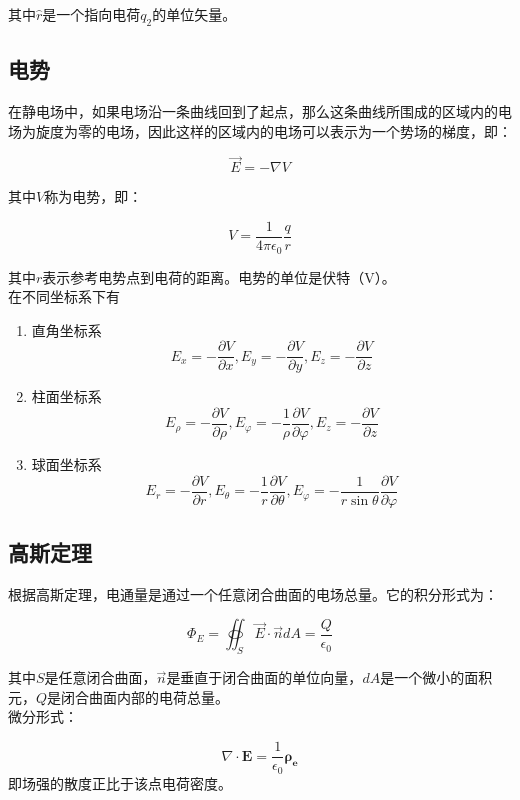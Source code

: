 其中$\hat{r}$是一个指向电荷$q_2$的单位矢量。

\subsection{电势}

在静电场中，如果电场沿一条曲线回到了起点，那么这条曲线所围成的区域内的电场为旋度为零的电场，因此这样的区域内的电场可以表示为一个势场的梯度，即：

$$ \vec{E} = -\nabla V $$

其中$V$称为电势，即：

$$ V = \frac{1}{4\pi\epsilon_0}\frac{q}{r} $$

其中$r$表示参考电势点到电荷的距离。电势的单位是伏特（V）。\\
在不同坐标系下有
\begin{enumerate}
	\item 直角坐标系 
	\begin{equation}\label{key}
		E_x=-\dfrac{\partial V}{\partial x},	E_y=-\dfrac{\partial V}{\partial y},	E_z=-\dfrac{\partial V}{\partial z}
	\end{equation}
\item 柱面坐标系
\begin{equation}\label{key}
	E_\rho=-\dfrac{\partial V}{\partial \rho},
	E_\varphi=-\dfrac{1}{\rho}\dfrac{\partial V}{\partial \varphi},
	E_z=-\dfrac{\partial V}{\partial z}
\end{equation}
\item 球面坐标系
\begin{equation}\label{key}
	E_r=-\dfrac{\partial V}{\partial r},
	E_\theta=-\dfrac{1}{r}\dfrac{\partial V}{\partial \theta},
	E_\varphi=-\dfrac{1}{r\sin \theta}\dfrac{\partial V}{\partial \varphi}
\end{equation}
\end{enumerate}
\subsection{高斯定理}

根据高斯定理，电通量是通过一个任意闭合曲面的电场总量。它的积分形式为：

$$ \Phi_E = \oiint_S \vec{E}\cdot\vec{n}dA = \frac{Q}{\epsilon_0} $$

其中$S$是任意闭合曲面，$\vec{n}$是垂直于闭合曲面的单位向量，$dA$是一个微小的面积元，$Q$是闭合曲面内部的电荷总量。\\
微分形式：

\begin{equation}\label{key}
	\nabla\cdot \bm{E}=\dfrac{1}{\epsilon_0}\bm{\rho_e}
\end{equation}
即场强的散度正比于该点电荷密度。
